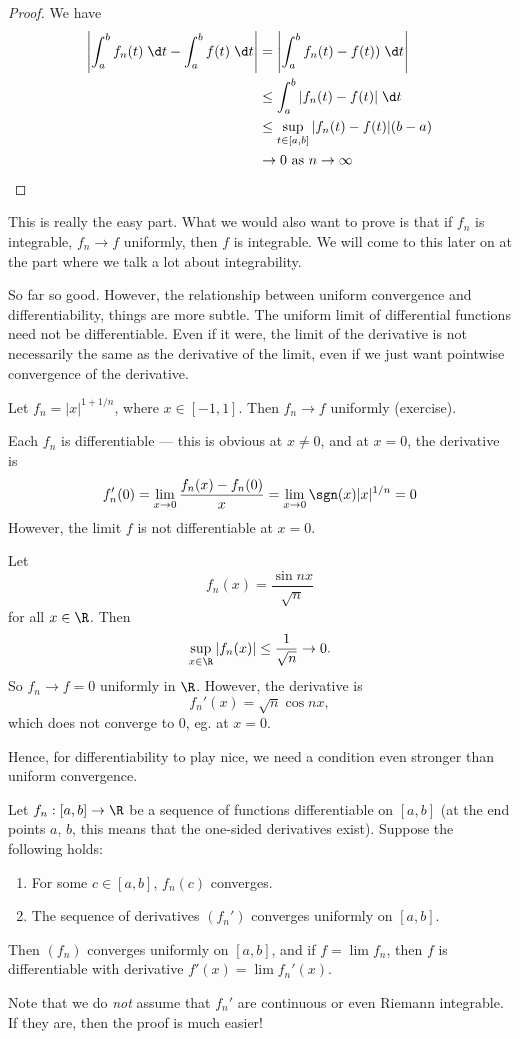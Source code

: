\documentclass[a4paper]{article}
\begin{document}
\begin{proof}
  We have
  \begin{align*}
    \left|\int_a^b f_n(t) \;\d t - \int_a^b f(t)\;\d t\right| &= \left|\int_a^b f_n(t) - f(t))\;\d t\right|\\
    &\leq \int_a^b |f_n(t) - f(t)|\;\d t\\
    &\leq \sup_{t\in [a, b]}|f_n(t) - f(t)| (b - a)\\
    &\to 0\text{ as }n\to \infty
  \end{align*}
\end{proof}
This is really the easy part. What we would also want to prove is that if $f_n$ is integrable, $f_n \to f$ uniformly, then $f$ is integrable. We will come to this later on at the part where we talk a lot about integrability.

So far so good. However, the relationship between uniform convergence and differentiability, things are more subtle. The uniform limit of differential functions need not be differentiable. Even if it were, the limit of the derivative is not necessarily the same as the derivative of the limit, even if we just want pointwise convergence of the derivative.

\begin{eg}
  Let $f_n = |x|^{1 + 1/n}$, where $x \in [-1, 1]$. Then $f_n \to f$ uniformly (exercise).

  Each $f_n$ is differentiable --- this is obvious at $x \not= 0$, and at $x = 0$, the derivative is
  \[
    f_n'(0) = \lim_{x \to 0}\frac{f_n (x) - f_n(0)}{x} = \lim_{x \to 0} \sgn(x) |x|^{1/n} = 0
  \]
  However, the limit $f$ is not differentiable at $x = 0$.
\end{eg}

\begin{eg}
  Let
  \[
    f_n(x) = \frac{\sin nx}{\sqrt{n}}
  \]
  for all $x\in \R$. Then
  \[
    \sup_{x\in \R}|f_n (x)| \leq \frac{1}{\sqrt{n}} \to 0.
  \]
  So $f_n \to f = 0$ uniformly in $\R$. However, the derivative is
  \[
    f_n'(x) = \sqrt{n} \cos nx,
  \]
  which does not converge to $0$, eg. at $x = 0$.
\end{eg}

Hence, for differentiability to play nice, we need a condition even stronger than uniform convergence.
\begin{thm}
  Let $f_n: [a, b]\to \R$ be a sequence of functions differentiable on $[a, b]$ (at the end points $a$, $b$, this means that the one-sided derivatives exist). Suppose the following holds:
  \begin{enumerate}
    \item For some $c\in [a, b]$, $f_n(c)$ converges.
    \item The sequence of derivatives $(f_n')$ converges uniformly on $[a, b]$.
  \end{enumerate}
  Then $(f_n)$ converges uniformly on $[a, b]$, and if $f = \lim f_n$, then $f$ is differentiable with derivative $f'(x) = \lim f_n'(x)$.
\end{thm}
Note that we do \emph{not} assume that $f_n'$ are continuous or even Riemann integrable. If they are, then the proof is much easier!
\end{document}
